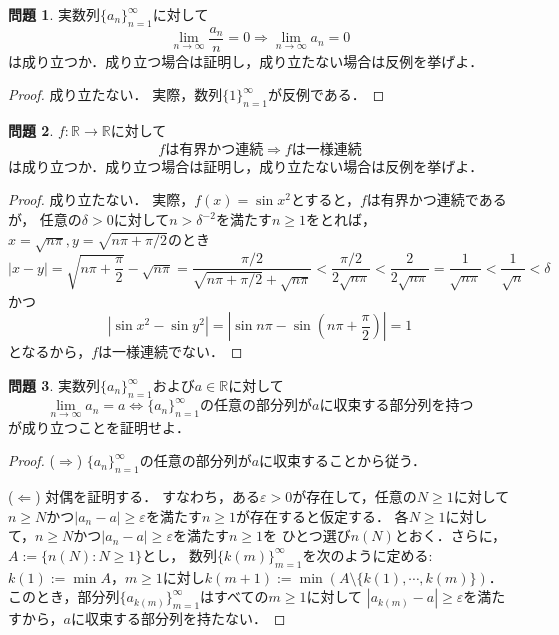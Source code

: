 \documentclass{jsarticle}
\theoremstyle{definition}
\newtheorem{qst}{問題}
\begin{document}
\begin{qst}
実数列$\{a_n\}_{n=1}^\infty$に対して
\[ \lim_{n\to\infty}\frac{a_n}{n}=0\Rightarrow\lim_{n\to\infty}a_n=0 \]
は成り立つか．成り立つ場合は証明し，成り立たない場合は反例を挙げよ．
\end{qst}
\begin{proof}
成り立たない．
実際，数列$\{1\}_{n=1}^\infty$が反例である．
\end{proof}

\begin{qst}
$f\colon\mathbb{R}\to\mathbb{R}$に対して
\[ f は有界かつ連続 \Rightarrow f は一様連続 \]
は成り立つか．成り立つ場合は証明し，成り立たない場合は反例を挙げよ．
\end{qst}
\begin{proof}
成り立たない．
実際，$f(x)=\sin{x^2}$とすると，$f$は有界かつ連続であるが，
任意の$\delta>0$に対して$n>\delta^{-2}$を満たす$n\geq1$をとれば，
$x=\sqrt{n\pi}, y=\sqrt{n\pi+\pi/2}$のとき
\[ |x-y|=\sqrt{n\pi+\frac{\pi}{2}}-\sqrt{n\pi}
=\frac{\pi/2}{\sqrt{n\pi+\pi/2}+\sqrt{n\pi}}
<\frac{\pi/2}{2\sqrt{n\pi}}<\frac{2}{2\sqrt{n\pi}}
=\frac{1}{\sqrt{n\pi}}<\frac{1}{\sqrt{n}}
<\delta \]
かつ
\[ |\sin{x^2}-\sin{y^2}|=\left|\sin{n\pi}-\sin\left(n\pi+\frac{\pi}{2}\right)\right|=1 \]
となるから，$f$は一様連続でない．
\end{proof}

\begin{qst}
実数列$\{a_n\}_{n=1}^\infty$および$a\in\mathbb{R}$に対して
\[ \lim_{n\to\infty}a_n=a\Leftrightarrow\{a_n\}_{n=1}^\infty の任意の部分列が a に収束する部分列を持つ \]
が成り立つことを証明せよ．
\end{qst}
\begin{proof}
($\Rightarrow$)
$\{a_n\}_{n=1}^\infty$の任意の部分列が$a$に収束することから従う．

($\Leftarrow$)
対偶を証明する．
すなわち，ある$\varepsilon>0$が存在して，任意の$N\geq1$に対して
$n\geq N$かつ$|a_n-a|\geq\varepsilon$を満たす$n\geq1$が存在すると仮定する．
各$N\geq1$に対して，$n\geq N$かつ$|a_n-a|\geq\varepsilon$を満たす$n\geq1$を
ひとつ選び$n(N)$とおく．さらに，$A:=\{n(N):N\geq1\}$とし，
数列$\{k(m)\}_{m=1}^\infty$を次のように定める:
$k(1):=\min A$，$m\geq1$に対し$k(m+1):=\min(A\setminus\{k(1),\cdots,k(m)\})$．
このとき，部分列$\{a_{k(m)}\}_{m=1}^\infty$はすべての$m\geq1$に対して
$|a_{k(m)}-a|\geq\varepsilon$を満たすから，$a$に収束する部分列を持たない．
\end{proof}
\end{document}
